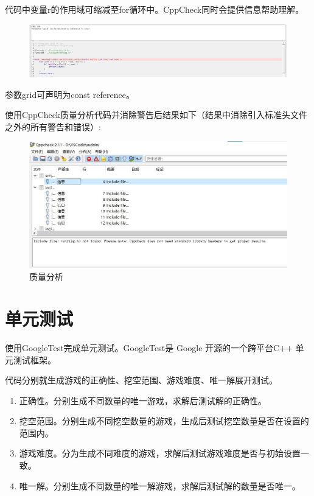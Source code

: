 \documentclass[a4paper]{article}
\begin{document}
代码中变量r的作用域可缩减至for循环中。CppCheck同时会提供信息帮助理解。


\begin{figure}[H]
  \centering
  \includegraphics[scale=0.4]{images/ncppcheck_2.jpg}
  \label{fig:ncppcheck_2}
\end{figure}

参数grid可声明为const reference。

使用CppCheck质量分析代码并消除警告后结果如下（结果中消除引入标准头文件之外的所有警告和错误）:
\begin{figure}[H]
  \centering
  \includegraphics[scale=0.6]{images/cppcheck.jpg}
  \caption{质量分析}
  \label{fig:cppcheck}
\end{figure}

\section{单元测试}使用GoogleTest完成单元测试。GoogleTest是 Google 开源的一个跨平台C++ 单元测试框架。

代码分别就生成游戏的正确性、挖空范围、游戏难度、唯一解展开测试。
\begin{enumerate}
  \item 正确性。分别生成不同数量的唯一游戏，求解后测试解的正确性。
  \item 挖空范围。分别生成不同挖空数量的游戏，生成后测试挖空数量是否在设置的范围内。
  \item 游戏难度。分为生成不同难度的游戏，求解后测试游戏难度是否与初始设置一致。
  \item 唯一解。分别生成不同数量的唯一解游戏，求解后测试解的数量是否唯一。
\end{enumerate}
\end{document}
